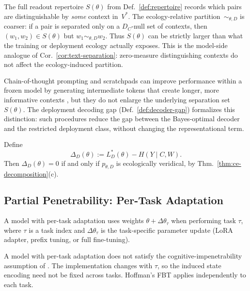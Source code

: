 \documentclass[twoside,11pt]{article}
\newcommand{\thmref}[1]{Thm.~\ref{#1}}
\newcommand{\corref}[1]{Cor.~\ref{#1}}
\newcommand{\defref}[1]{Def.~\ref{#1}}
\begin{document}
\begin{remark}
The full readout repertoire $S(\theta)$ from \defref{def:repertoire} records which pairs are distinguishable by \emph{some} context in~$V^*$.
The ecology-relative partition~$\sim_{\theta,D}$ is coarser: if a pair is separated only on a $D_C$-null set of contexts, then $(w_1,w_2) \in S(\theta)$ but $w_1 \sim_{\theta,D} w_2$.
Thus $S(\theta)$ can be strictly larger than what the training or deployment ecology actually exposes.
This is the model-side analogue of \corref{cor:text-separation}: zero-measure distinguishing contexts do not affect the ecology-induced partition.
\end{remark}

Chain-of-thought prompting and scratchpads can improve performance within a frozen model by generating intermediate tokens that create longer, more informative contexts \citep{wei_etal_2022_cot,nye_etal_2021_scratchpads}, but they do not enlarge the underlying separation set $S(\theta)$. The deployment decoding gap (\defref{def:decoder-gap}) formalizes this distinction: such procedures reduce the gap between the Bayes-optimal decoder and the restricted deployment class, without changing the representational term.

\begin{definition}\label{def:model-risk}
Define
\[
\Delta_D(\theta) := L_D^*(\theta) - H(Y \mid C,W).
\]
Then $\Delta_D(\theta)=0$ if and only if $p_{\theta,D}$ is ecologically veridical, by \thmref{thm:ce-decomposition}(c).
\end{definition}

\subsection{Partial Penetrability: Per-Task Adaptation}\label{sec:penetrability}

\begin{definition}
A model with per-task adaptation uses weights $\theta + \Delta\theta_\tau$ when performing task $\tau$, where $\tau$ is a task index and $\Delta\theta_\tau$ is the task-specific parameter update (LoRA adapter, prefix tuning, or full fine-tuning).
\end{definition}

\begin{proposition}
A model with per-task adaptation does not satisfy the cognitive-impenetrability assumption of \citet{dallariva_2026}. The implementation changes with $\tau$, so the induced state encoding need not be fixed across tasks. Hoffman's FBT applies independently to each task.
\end{proposition}
\end{document}
